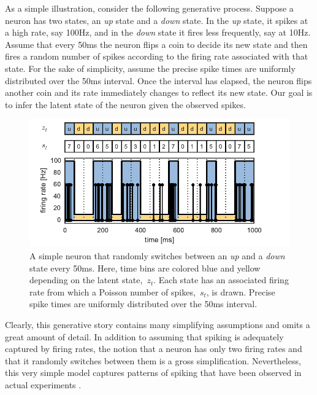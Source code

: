 As a simple illustration, consider the following generative
process. Suppose a neuron has two states, an \emph{up} state and a
\emph{down} state. In the \emph{up} state, it spikes at a high
rate, say 100Hz, and in the \emph{down} state it fires less frequently, say at 10Hz.
Assume that every 50ms the neuron flips a coin to decide its new state
and then fires a random number of spikes according to the
firing rate associated with that state. For the sake of simplicity, 
assume the precise spike times are uniformly distributed over the 50ms
interval. Once the interval has elapsed, the neuron
flips another coin and its rate immediately changes to reflect its new
state.   Our goal is to infer the latent state of
the neuron given the observed spikes.

\begin{figure}[t]
\centering%
\includegraphics[width=5.5in]{figures/ch2/figure1} 
\caption[Simple neuron with up and down states]{A simple neuron that
  randomly switches between an \textit{up} and a \textit{down} state
  every 50ms. Here, time bins are colored blue and yellow depending on
  the latent state,~$z_t$. Each state has an associated firing rate from
  which a Poisson number of spikes,~$s_t$, is drawn. Precise spike
  times are uniformly distributed over the 50ms interval.}
\label{fig:updown}
\vspace{-0.5cm}
\end{figure}


Clearly, this generative story contains many simplifying assumptions
and omits a great amount of detail. In addition to assuming that
spiking is adequately captured by firing rates, the notion that a
neuron has only two firing rates and that it randomly switches between
them is a gross simplification. Nevertheless, this very
simple model captures patterns of spiking that have been observed
in actual experiments \citep{cowan1994spontaneous, shu2003turning}. 

